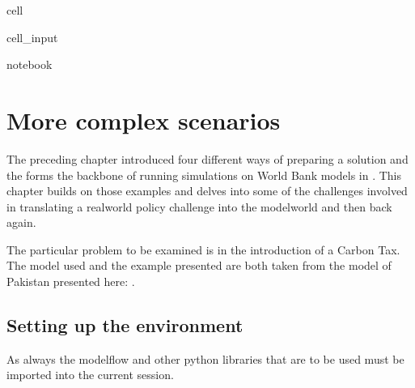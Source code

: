 \documentclass[letterpaper,10pt,english]{jupyterBook}
\begin{document}
\begin{sphinxuseclass}{cell}\begin{sphinxVerbatimInput}

\begin{sphinxuseclass}{cell_input}
\begin{sphinxVerbatim}[commandchars=\\\{\}]
 notebook
\end{sphinxVerbatim}

\end{sphinxuseclass}\end{sphinxVerbatimInput}

\end{sphinxuseclass}

\chapter{More complex scenarios}
\label{\detokenize{content/05_WBModels/MoreComplexScenarios:more-complex-scenarios}}\label{\detokenize{content/05_WBModels/MoreComplexScenarios::doc}}
\sphinxAtStartPar
The preceding chapter introduced four different ways of preparing a solution and the forms the backbone of running simulations on World Bank models in . This chapter builds on those examples and delves into some of the challenges involved in translating a real\sphinxhyphen{}world policy challenge into the model\sphinxhyphen{}world and then back again.

\sphinxAtStartPar
The particular problem to be examined is in the introduction of a Carbon Tax. The model used and the example presented are both taken from the model of Pakistan presented here: .


\section{Setting up the environment}
\label{\detokenize{content/05_WBModels/MoreComplexScenarios:setting-up-the-environment}}
\sphinxAtStartPar
As always the modelflow and other python libraries that are to be used must be imported into the current session.
\end{document}

